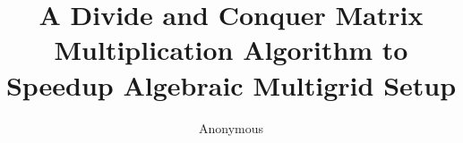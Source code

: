 \documentclass[sigconf]{acmart}
\begin{document}
\title{A Divide and Conquer Matrix Multiplication Algorithm to Speedup Algebraic Multigrid Setup}

\author{Anonymous}





\end{document}
